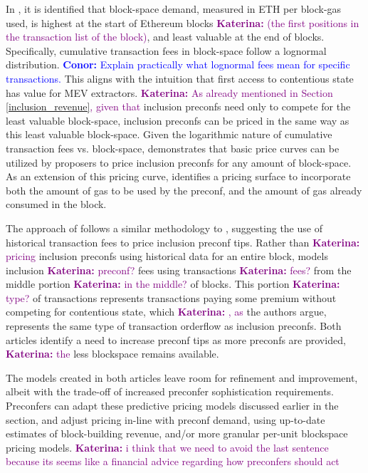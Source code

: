 \documentclass[a4paper]{article}
\theoremstyle{boldstyle}
\newcommand{\cm}[1]{\textcolor{blue}{\textbf{Conor:} #1}}
\newcommand{\ks}[1]{\textcolor{purple}{\textbf{Katerina:} #1}}
\begin{document}
     In \cite{W:APricingModelforInclusionPreconfirmations}, it is identified that block-space demand, measured in ETH per block-gas used, is highest at the start of Ethereum blocks \ks{(the first positions  in the transaction list of the block)}, and least valuable at the end of blocks. Specifically, cumulative transaction fees in block-space follow a lognormal distribution. \cm{Explain practically what lognormal fees mean for specific transactions.} This aligns with the intuition that first access to contentious state has value for MEV extractors. \ks{ As already mentioned in Section \ref{inclusion_revenue}, given that} inclusion preconfs need only to compete for the least valuable block-space, inclusion preconfs can be priced in the same way as this least valuable block-space. Given the logarithmic nature of cumulative transaction fees vs. block-space, \cite{W:APricingModelforInclusionPreconfirmations} demonstrates that basic price curves can be utilized by proposers to price inclusion preconfs for any amount of block-space. As an extension of this pricing curve,  \cite{W:APricingModelforInclusionPreconfirmations} identifies a pricing surface to incorporate both the amount of gas to be used by the preconf, and the amount of gas already consumed in the block. 
     
    The approach of \cite{W:PricingTransactionsforPreconfirmation} follows a similar methodology to \cite{W:APricingModelforInclusionPreconfirmations}, suggesting the use of historical transaction fees to price inclusion preconf tips. Rather than \ks{pricing} inclusion preconfs using historical data for an entire block, \cite{W:PricingTransactionsforPreconfirmation} models inclusion \ks{preconf?} fees using transactions \ks{fees?} from the middle portion \ks{in the middle?} of blocks. This portion \ks{type?} of transactions represents transactions paying some premium without competing for contentious state, which \ks{, as} the authors argue, represents the same type of transaction orderflow as inclusion preconfs. Both articles identify a need to increase preconf tips as more preconfs are provided, \ks{the} less blockspace remains available. 
    
    The models created in both articles leave room for refinement and improvement, albeit with the trade-off of increased preconfer sophistication requirements. Preconfers can adapt these predictive pricing models discussed earlier in the section, and adjust pricing in-line with preconf demand, using up-to-date estimates of block-building revenue, and/or more granular per-unit blockspace pricing models. \ks{ i think that we need to avoid the last sentence because its seems like a financial advice regarding how preconfers should act}
\end{document}
